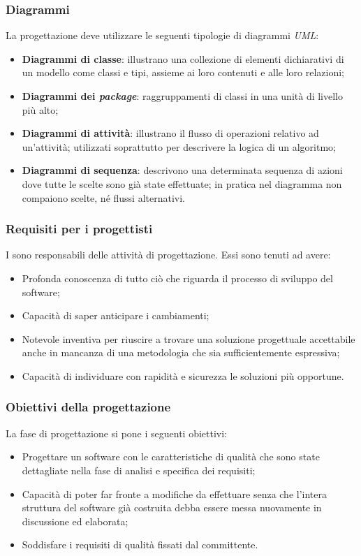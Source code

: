 \subsubsection{Diagrammi}
La progettazione deve utilizzare le seguenti tipologie di diagrammi \textit{UML}:
\begin{itemize} 
\item
\textbf{Diagrammi di classe}: illustrano una collezione di elementi dichiarativi di un modello come classi e tipi, assieme ai loro contenuti e alle loro relazioni;  
\item
\textbf{Diagrammi dei \textit{package}}: raggruppamenti di classi in una unità di livello più alto;
\item
\textbf{Diagrammi di attività}: illustrano il flusso di operazioni relativo ad un'attività; utilizzati soprattutto per descrivere la logica di un algoritmo;  
\item
\textbf{Diagrammi di sequenza}: descrivono una determinata sequenza di azioni dove tutte le scelte sono già state effettuate; in pratica nel diagramma non compaiono scelte, né flussi alternativi.
\end{itemize}


\subsubsection{Requisiti per i progettisti}

I \textit{\Progs} sono responsabili delle attività di progettazione. Essi sono tenuti ad avere:
\begin{itemize} 
\item
Profonda conoscenza di tutto ciò che riguarda il processo di sviluppo del software;
\item
Capacità di saper anticipare i cambiamenti;
\item
Notevole inventiva per riuscire a trovare una soluzione progettuale accettabile anche in mancanza di una metodologia che sia sufficientemente espressiva;
\item
Capacità di individuare con rapidità e sicurezza le soluzioni più opportune.
\end{itemize}

\subsubsection{Obiettivi della progettazione}
La fase di progettazione si pone i seguenti obiettivi:
\begin{itemize} 
\item
Progettare un software con le caratteristiche di qualità che sono state dettagliate nella fase di analisi e specifica dei requisiti;
\item
Capacità di poter far fronte a modifiche da effettuare senza che l'intera struttura del software già costruita debba essere messa nuovamente in discussione ed elaborata;
\item
Soddisfare i requisiti di qualità fissati dal committente.
\end{itemize}

